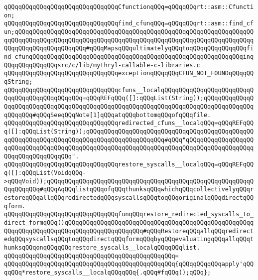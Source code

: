 \newline
\verb|qQQqqQQqqQQqqQQqqQQqqQQqqQQqqQQqCfunctionqQQq=qQQqqQQqrt::asm::Cfunction;|\newline
\newline
\verb|qQQqqQQqqQQqqQQqqQQqqQQqqQQqqQQqfind_cfunqQQq=qQQqqQQqrt::asm::find_cfun;qQQqqQQqqQQqqQQqqQQqqQQqqQQqqQQqqQQqqQQqqQQqqQQqqQQqqQQqqQQqqQQqqQQqqQQqqQQqqQQqqQQqqQQqqQQqqQQqqQQqqQQqqQQqqQQqqQQqqQQqqQQqqQQqqQQqqQQqqQQqqQQqqQQqqQQqqQQqqQQq#qQQqMapsqQQqultimatelyqQQqtoqQQqqQQqqQQqqQQqfind_cfunqQQqqQQqqQQqqQQqqQQqqQQqqQQqqQQqqQQqqQQqqQQqqQQqqQQqqQQqqQQqinqQQqqQQqqQQqqQQqsrc/c/lib/mythryl-callable-c-libraries.c|\newline
\newline
\verb|qQQqqQQqqQQqqQQqqQQqqQQqqQQqqQQqexceptionqQQqqQQqCFUN_NOT_FOUNDqQQqqQQqString;|\newline
\newline
\verb|qQQqqQQqqQQqqQQqqQQqqQQqqQQqqQQqcfuns__localqQQqqQQqqQQqqQQqqQQqqQQqqQQqqQQqqQQqqQQqqQQqqQQq=qQQqREFqQQq([]:qQQqList(String));qQQqqQQqqQQqqQQqqQQqqQQqqQQqqQQqqQQqqQQqqQQqqQQqqQQqqQQqqQQqqQQqqQQqqQQqqQQqqQQqqQQqqQQqqQQq#qQQqSeeqQQqNote[1]qQQqatqQQqbottomqQQqofqQQqfile.|\newline
\verb|qQQqqQQqqQQqqQQqqQQqqQQqqQQqqQQqredirected_cfuns__localqQQq=qQQqREFqQQq([]:qQQqList(String));qQQqqQQqqQQqqQQqqQQqqQQqqQQqqQQqqQQqqQQqqQQqqQQqqQQqqQQqqQQqqQQqqQQqqQQqqQQqqQQqqQQqqQQqqQQq#qQQq"qQQqqQQqqQQqqQQqqQQqqQQqqQQqqQQqqQQqqQQqqQQqqQQqqQQqqQQqqQQqqQQqqQQqqQQqqQQqqQQqqQQqqQQqqQQqqQQqqQQqqQQqqQQq".|\newline
\verb|qQQqqQQqqQQqqQQqqQQqqQQqqQQqqQQqrestore_syscalls__localqQQq=qQQqREFqQQq([]:qQQqList(VoidqQQq->qQQqVoid));qQQqqQQqqQQqqQQqqQQqqQQqqQQqqQQqqQQqqQQqqQQqqQQqqQQqqQQqqQQqqQQqqQQq#qQQqAqQQqlistqQQqofqQQqthunksqQQqwhichqQQqcollectivelyqQQqrestoreqQQqallqQQqredirectedqQQqsyscallsqQQqtoqQQqoriginalqQQqdirectqQQqform.|\newline
\newline
\verb|qQQqqQQqqQQqqQQqqQQqqQQqqQQqqQQqfunqQQqrestore_redirected_syscalls_to_direct_formqQQq()qQQqqQQqqQQqqQQqqQQqqQQqqQQqqQQqqQQqqQQqqQQqqQQqqQQqqQQqqQQqqQQqqQQqqQQqqQQqqQQqqQQqqQQqqQQq#qQQqRestoreqQQqallqQQqredirectedqQQqsyscallsqQQqtoqQQqdirectqQQqformqQQqbyqQQqevaluatingqQQqallqQQqthunksqQQqonqQQqqQQqrestore_syscalls__localqQQqqQQqlist.|\newline
\verb|qQQqqQQqqQQqqQQqqQQqqQQqqQQqqQQqqQQqqQQqqQQqqQQq=|\newline
\verb|qQQqqQQqqQQqqQQqqQQqqQQqqQQqqQQqqQQqqQQqqQQqqQQq{qQQqqQQqqQQqapply'qQQqqQQq*restore_syscalls__localqQQqqQQq{.qQQq#fqQQq();qQQq};|\newline
